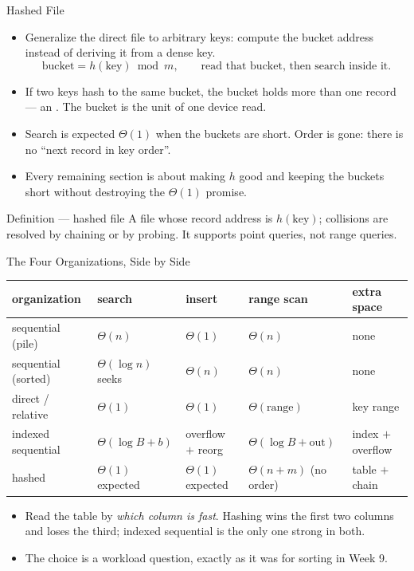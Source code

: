 \documentclass[aspectratio=169]{beamer}
\begin{document}
\begin{frame}{Hashed File}
  \begin{itemize}
    \item Generalize the direct file to arbitrary keys: compute the bucket
      address instead of deriving it from a dense key.
      \[
        \text{bucket} = h(\text{key}) \bmod m,
        \qquad \text{read that bucket, then search inside it.}
      \]
    \item If two keys hash to the same bucket, the bucket holds more than one
      record --- an . The bucket is the unit of one device
      read.
    \item Search is expected $\Theta(1)$ when the buckets are short. Order is
      gone: there is no ``next record in key order''.
    \item Every remaining section is about making $h$ good and keeping the
      buckets short without destroying the $\Theta(1)$ promise.
  \end{itemize}
  \begin{block}{Definition --- hashed file}
    A file whose record address is $h(\text{key})$; collisions are resolved
    by chaining or by probing. It supports point queries, not range queries.
  \end{block}
\end{frame}

\begin{frame}{The Four Organizations, Side by Side}
  \begin{center}
  {\scriptsize\setlength{\tabcolsep}{4pt}
  \begin{tabular}{p{2.6cm} p{2.1cm} p{2.1cm} p{2.6cm} p{2.5cm}}
    \toprule
    \textbf{organization} & \textbf{search} & \textbf{insert} &
      \textbf{range scan} & \textbf{extra space} \\
    \midrule
    sequential (pile) & $\Theta(n)$ & $\Theta(1)$ & $\Theta(n)$ &
      none \\
    sequential (sorted) & $\Theta(\log n)$ seeks & $\Theta(n)$ &
      $\Theta(n)$ & none \\
    direct / relative & $\Theta(1)$ & $\Theta(1)$ & $\Theta(\text{range})$ &
      key range \\
    indexed sequential & $\Theta(\log B + b)$ & overflow $+$ reorg &
      $\Theta(\log B + \text{out})$ & index $+$ overflow \\
    hashed & $\Theta(1)$ expected & $\Theta(1)$ expected &
      $\Theta(n+m)$ (no order) & table $+$ chain \\
    \bottomrule
  \end{tabular}}
  \end{center}
  \begin{itemize}
    \item Read the table by \emph{which column is fast}. Hashing wins the
      first two columns and loses the third; indexed sequential is the only
      one strong in both.
    \item The choice is a workload question, exactly as it was for sorting in
      Week 9.
  \end{itemize}
\end{frame}
\end{document}
